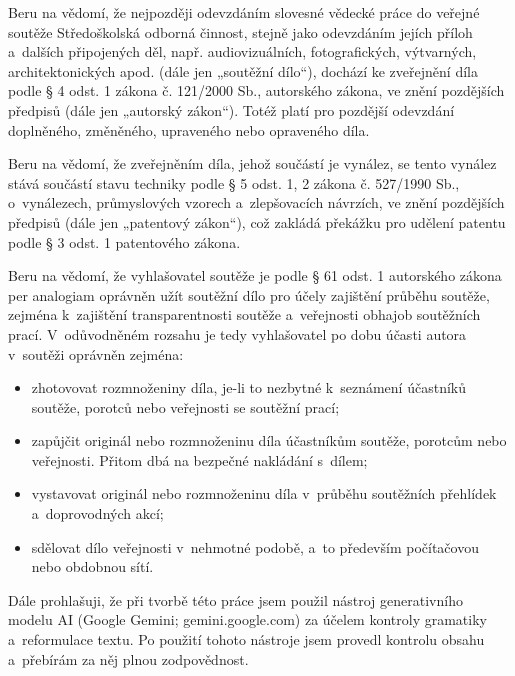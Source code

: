\documentclass[a4paper]{article}
\begin{document}
Beru na vědomí, že nejpozději odevzdáním slovesné vědecké práce do veřejné soutěže Středoškolská odborná činnost, stejně jako odevzdáním jejích příloh a~dalších připojených děl, např. audiovizuálních, fotografických, výtvarných, architektonických apod. (dále jen „soutěžní dílo“), dochází ke zveřejnění díla podle § 4 odst. 1 zákona č. 121/2000 Sb., autorského zákona, ve znění pozdějších předpisů (dále jen „autorský zákon“). Totéž platí pro pozdější odevzdání doplněného, změněného, upraveného nebo opraveného díla. 

Beru na vědomí, že zveřejněním díla, jehož součástí je vynález, se tento vynález stává součástí stavu techniky podle § 5 odst. 1, 2 zákona č. 527/1990 Sb., o~vynálezech, průmyslových vzorech a~zlepšovacích návrzích, ve znění pozdějších předpisů (dále jen „patentový zákon“), což zakládá překážku pro udělení patentu podle § 3 odst. 1 patentového zákona.

Beru na vědomí, že vyhlašovatel soutěže je podle § 61 odst. 1 autorského zákona per analogiam oprávněn užít soutěžní dílo pro účely zajištění průběhu soutěže, zejména k~zajištění transparentnosti soutěže a~veřejnosti obhajob soutěžních prací. V~odůvodněném rozsahu je tedy vyhlašovatel po dobu účasti autora v~soutěži oprávněn zejména:

\begin{itemize}
    \item zhotovovat rozmnoženiny díla, je-li to nezbytné k~seznámení účastníků soutěže, porotců nebo veřejnosti se soutěžní prací; 

    \item zapůjčit originál nebo rozmnoženinu díla účastníkům soutěže, porotcům nebo veřejnosti. Přitom dbá na bezpečné nakládání s~dílem; 

    \item vystavovat originál nebo rozmnoženinu díla v~průběhu soutěžních přehlídek a~doprovodných akcí;  

    \item sdělovat dílo veřejnosti v~nehmotné podobě, a~to především počítačovou nebo obdobnou sítí. 
\end{itemize}

Dále prohlašuji, že při tvorbě této práce jsem použil nástroj generativního modelu AI (Google Gemini; gemini.google.com) za účelem kontroly gramatiky a~reformulace textu. Po použití tohoto nástroje jsem provedl kontrolu obsahu a~přebírám za něj plnou zodpovědnost.\\[3cm] 
\end{document}
